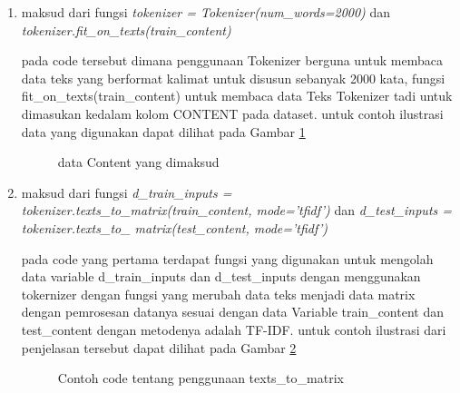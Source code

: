 \begin{enumerate}
\item maksud dari fungsi \emph{tokenizer = Tokenizer(num\_words=2000)} dan \emph{tokenizer.fit\_on\_texts(train\_content)}
\par pada code tersebut dimana penggunaan Tokenizer berguna untuk membaca data teks yang berformat kalimat untuk disusun sebanyak 2000 kata, fungsi fit\_on\_texts(train\_content) untuk membaca data Teks Tokenizer tadi untuk dimasukan kedalam kolom CONTENT pada dataset. untuk contoh ilustrasi data yang digunakan dapat dilihat pada Gambar \ref{data5}

\begin{figure}[!htbp]
      \caption{data Content yang dimaksud}
      \label{data5}
\end{figure}

\item maksud dari fungsi \emph{d\_train\_inputs = tokenizer.texts\_to\_matrix(train\_content, mode='tfidf')} dan \emph{d\_test\_inputs = tokenizer.texts\_to\_ matrix(test\_content, mode='tfidf')}

\par pada code yang pertama terdapat fungsi yang digunakan untuk mengolah data variable d\_train\_inputs dan d\_test\_inputs dengan menggunakan tokernizer dengan fungsi yang merubah data teks menjadi data matrix dengan pemrosesan datanya sesuai dengan data Variable train\_content dan test\_content dengan metodenya adalah TF-IDF. untuk contoh ilustrasi dari penjelasan tersebut dapat dilihat pada Gambar \ref{data6}

\begin{figure}[!htbp]
      \caption{Contoh code tentang penggunaan texts\_to\_matrix}
      \label{data6}
\end{figure}


\end{enumerate}
